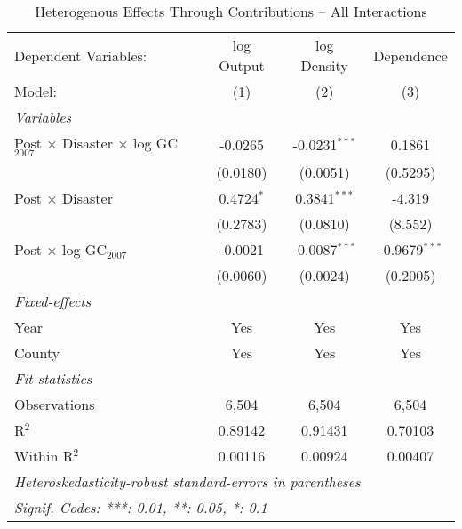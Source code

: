
\begin{table}[htbp]
   \caption{Heterogenous Effects Through Contributions -- All Interactions}
   \centering
   \begin{adjustbox}{max width = \textwidth, center}
      \begin{tabular}{lccc}
         \tabularnewline \midrule \midrule
         Dependent Variables:                              & log Output   & log Density     & Dependence\\  
         Model:                                            & (1)          & (2)             & (3)\\  
         \midrule
         \emph{Variables}\\
         Post $\times$ Disaster $\times$ log GC$_{2007}$   & -0.0265      & -0.0231$^{***}$ & 0.1861\\   
                                                           & (0.0180)     & (0.0051)        & (0.5295)\\   
         Post $\times$ Disaster                            & 0.4724$^{*}$ & 0.3841$^{***}$  & -4.319\\   
                                                           & (0.2783)     & (0.0810)        & (8.552)\\   
         Post $\times$ log GC$_{2007}$                     & -0.0021      & -0.0087$^{***}$ & -0.9679$^{***}$\\   
                                                           & (0.0060)     & (0.0024)        & (0.2005)\\   
         \midrule
         \emph{Fixed-effects}\\
         Year                                              & Yes          & Yes             & Yes\\  
         County                                            & Yes          & Yes             & Yes\\  
         \midrule
         \emph{Fit statistics}\\
         Observations                                      & 6,504        & 6,504           & 6,504\\  
         R$^2$                                             & 0.89142      & 0.91431         & 0.70103\\  
         Within R$^2$                                      & 0.00116      & 0.00924         & 0.00407\\  
         \midrule \midrule
         \multicolumn{4}{l}{\emph{Heteroskedasticity-robust standard-errors in parentheses}}\\
         \multicolumn{4}{l}{\emph{Signif. Codes: ***: 0.01, **: 0.05, *: 0.1}}\\
      \end{tabular}
   \end{adjustbox}
\end{table}


